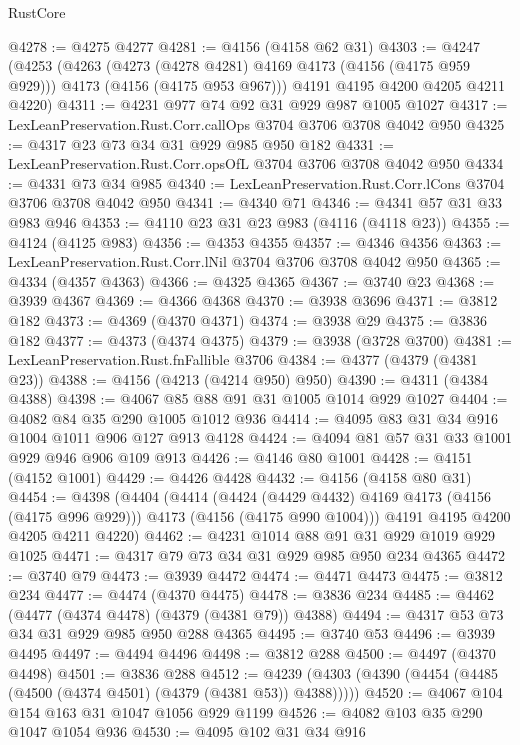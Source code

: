 \begin{lexlean}{RustCore}
\begin{coremodule}
@4278 := @4275 @4277
@4281 := @4156 (@4158 @62 @31)
@4303 := @4247
    (@4253
      (@4263
        (@4273 (@4278 @4281) @4169 @4173 (@4156 (@4175 @959 @929)))
        @4173
        (@4156 (@4175 @953 @967)))
      @4191
      @4195
      @4200
      @4205
      @4211
      @4220)
@4311 := @4231 @977 @74 @92 @31 @929 @987 @1005 @1027
@4317 := LexLeanPreservation.Rust.Corr.callOps @3704 @3706 @3708 @4042 @950
@4325 := @4317 @23 @73 @34 @31 @929 @985 @950 @182
@4331 := LexLeanPreservation.Rust.Corr.opsOfL @3704 @3706 @3708 @4042 @950
@4334 := @4331 @73 @34 @985
@4340 := LexLeanPreservation.Rust.Corr.lCons @3704 @3706 @3708 @4042 @950
@4341 := @4340 @71
@4346 := @4341 @57 @31 @33 @983 @946
@4353 := @4110 @23 @31 @23 @983 (@4116 (@4118 @23))
@4355 := @4124 (@4125 @983)
@4356 := @4353 @4355
@4357 := @4346 @4356
@4363 := LexLeanPreservation.Rust.Corr.lNil @3704 @3706 @3708 @4042 @950
@4365 := @4334 (@4357 @4363)
@4366 := @4325 @4365
@4367 := @3740 @23
@4368 := @3939 @4367
@4369 := @4366 @4368
@4370 := @3938 @3696
@4371 := @3812 @182
@4373 := @4369 (@4370 @4371)
@4374 := @3938 @29
@4375 := @3836 @182
@4377 := @4373 (@4374 @4375)
@4379 := @3938 (@3728 @3700)
@4381 := LexLeanPreservation.Rust.fnFallible @3706
@4384 := @4377 (@4379 (@4381 @23))
@4388 := @4156 (@4213 (@4214 @950) @950)
@4390 := @4311 (@4384 @4388)
@4398 := @4067 @85 @88 @91 @31 @1005 @1014 @929 @1027
@4404 := @4082 @84 @35 @290 @1005 @1012 @936
@4414 := @4095 @83 @31 @34 @916 @1004 @1011 @906 @127 @913 @4128
@4424 := @4094 @81 @57 @31 @33 @1001 @929 @946 @906 @109 @913
@4426 := @4146 @80 @1001
@4428 := @4151 (@4152 @1001)
@4429 := @4426 @4428
@4432 := @4156 (@4158 @80 @31)
@4454 := @4398
    (@4404
      (@4414
        (@4424 (@4429 @4432) @4169 @4173 (@4156 (@4175 @996 @929)))
        @4173
        (@4156 (@4175 @990 @1004)))
      @4191
      @4195
      @4200
      @4205
      @4211
      @4220)
@4462 := @4231 @1014 @88 @91 @31 @929 @1019 @929 @1025
@4471 := @4317 @79 @73 @34 @31 @929 @985 @950 @234 @4365
@4472 := @3740 @79
@4473 := @3939 @4472
@4474 := @4471 @4473
@4475 := @3812 @234
@4477 := @4474 (@4370 @4475)
@4478 := @3836 @234
@4485 := @4462 (@4477 (@4374 @4478) (@4379 (@4381 @79)) @4388)
@4494 := @4317 @53 @73 @34 @31 @929 @985 @950 @288 @4365
@4495 := @3740 @53
@4496 := @3939 @4495
@4497 := @4494 @4496
@4498 := @3812 @288
@4500 := @4497 (@4370 @4498)
@4501 := @3836 @288
@4512 := @4239 (@4303 (@4390 (@4454 (@4485 (@4500 (@4374 @4501) (@4379 (@4381 @53)) @4388)))))
@4520 := @4067 @104 @154 @163 @31 @1047 @1056 @929 @1199
@4526 := @4082 @103 @35 @290 @1047 @1054 @936
@4530 := @4095 @102 @31 @34 @916

\end{coremodule}
\end{lexlean}
